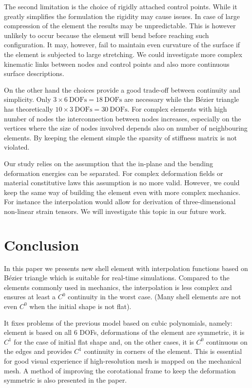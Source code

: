 \documentclass{egpubl}
\begin{document}
The second limitation is the choice of rigidly attached control points. 
While it greatly simplifies the formulation the rigidity may cause issues.
In case of large compression of the element the results may be
unpredictable. This is however unlikely to occur because the element will
bend before reaching such configuration. It may, however, fail to maintain
even curvature of the surface if the element is subjected to large
stretching.
We could investigate more complex kinematic links between nodes and control points 
and also more continuous surface descriptions.

On the other hand the choices provide a good trade-off between continuity
and simplicity. Only $ 3 \times 6~\mathrm{DOFs} = 18~\mathrm{DOFs}$ are
necessary while the B\'ezier triangle has theoretically $ 10 \times
3~\mathrm{DOFs} = 30~\mathrm{DOFs}$. For complex elements with high number
of nodes the interconnection between nodes increases, especially on the
vertices where the size of nodes involved depends also on number of
neighbouring elements. By keeping the element simple the sparsity of
stiffness matrix is not violated.

Our study relies on the assumption that the in-plane and the bending deformation energies can be separated.
For complex deformation fields or material constitutive laws  this assumption is no more valid.
However, we could keep the same way of building the element even with more complex mechanics. 
For instance the interpolation would allow for derivation of three-dimensional non-linear strain tensors.
We will investigate this topic in our future work.


\section{Conclusion} %

In this paper we presents new shell element with interpolation functions
based on B\'ezier triangle which is  suitable for real-time simulations.
Compared to  the elements commonly used in mechanics, the interpolation is less complex and ensures at least a $C^0$ continuity in the worst case. 
(Many shell elements are not even $C^0$ when the initial shape is not flat).

It fixes problems of the previous model \cite{Comas2010c} based on cubic
polynomials, namely: element is based on all 6 DOFs, deformations of the
element are symmetric, it is $C^1$ for the case of initial flat shape and, on
the other cases, it is $C^0$ continuous on the edges and provides $C^1$
continuity in corners of the element. This is essential for good visual
experience if high-resolution mesh is mapped on the mechanical mesh. A method
of improving the corotational frame to keep the deformation symmetric is also
presented in the paper.
\end{document}
